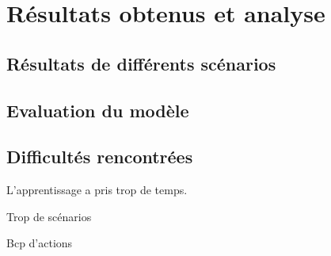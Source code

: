 
\section{Résultats obtenus et analyse}
 
\subsection{Résultats de différents scénarios}

\subsection{Evaluation du modèle}

\subsection{Difficultés rencontrées}


L’apprentissage a pris trop de temps.

Trop de scénarios

Bcp d’actions
